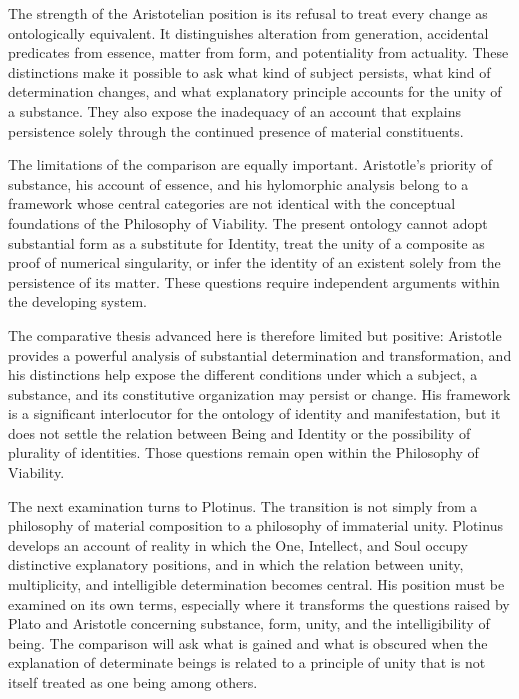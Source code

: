 \label{para:VS.B01.P01.C08.S05.SS10.P002}

The strength of the Aristotelian position is
its refusal to treat every change as ontologically
equivalent. It distinguishes alteration from
generation, accidental predicates from essence,
matter from form, and potentiality from actuality.
These distinctions make it possible to ask
what kind of subject persists, what kind of
determination changes, and what explanatory
principle accounts for the unity of a substance.
They also expose the inadequacy of an account
that explains persistence solely through the
continued presence of material constituents.

\label{para:VS.B01.P01.C08.S05.SS10.P003}

The limitations of the comparison are equally
important. Aristotle's priority of substance,
his account of essence, and his hylomorphic
analysis belong to a framework whose central
categories are not identical with the conceptual
foundations of the Philosophy of Viability.
The present ontology cannot adopt substantial
form as a substitute for Identity, treat
the unity of a composite as proof of numerical
singularity, or infer the identity of an
existent solely from the persistence of
its matter. These questions require independent
arguments within the developing system.

\label{para:VS.B01.P01.C08.S05.SS10.P004}

The comparative thesis advanced here is therefore
limited but positive: Aristotle provides a
powerful analysis of substantial determination
and transformation, and his distinctions help
expose the different conditions under which
a subject, a substance, and its constitutive
organization may persist or change. His
framework is a significant interlocutor for
the ontology of identity and manifestation,
but it does not settle the relation between
Being and Identity or the possibility of
plurality of identities. Those questions
remain open within the Philosophy of Viability.

\label{para:VS.B01.P01.C08.S05.SS10.P005}

The next examination turns to Plotinus.
The transition is not simply from a philosophy
of material composition to a philosophy of
immaterial unity. Plotinus develops an account
of reality in which the One, Intellect, and
Soul occupy distinctive explanatory positions,
and in which the relation between unity,
multiplicity, and intelligible determination
becomes central. His position must be examined
on its own terms, especially where it transforms
the questions raised by Plato and Aristotle
concerning substance, form, unity, and the
intelligibility of being. The comparison will
ask what is gained and what is obscured when
the explanation of determinate beings is
related to a principle of unity that is
not itself treated as one being among others.

